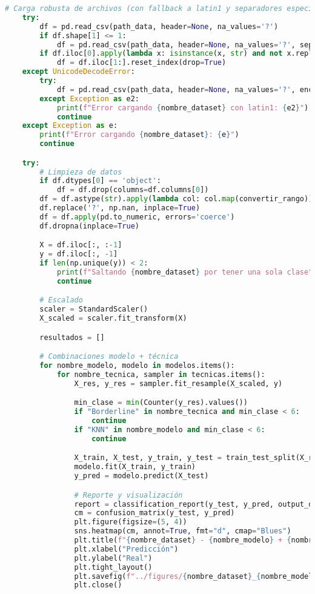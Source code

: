 \begin{lstlisting}[language=Python, caption={Script de experimentación automática}, label={lst:script_experimento}]
    # Carga robusta de archivos (con fallback a latin1 y separadores especiales)
    try:
        df = pd.read_csv(path_data, header=None, na_values='?')
        if df.shape[1] <= 1:
            df = pd.read_csv(path_data, header=None, na_values='?', sep='\s+')
        if df.iloc[0].apply(lambda x: isinstance(x, str) and not x.replace('.', '', 1).isdigit()).any():
            df = df.iloc[1:].reset_index(drop=True)
    except UnicodeDecodeError:
        try:
            df = pd.read_csv(path_data, header=None, na_values='?', encoding='latin1', sep='\s+', on_bad_lines='skip')
        except Exception as e2:
            print(f"Error cargando {nombre_dataset} con latin1: {e2}")
            continue
    except Exception as e:
        print(f"Error cargando {nombre_dataset}: {e}")
        continue

    try:
        # Limpieza de datos
        if df.dtypes[0] == 'object':
            df = df.drop(columns=df.columns[0])
        df = df.astype(str).apply(lambda col: col.map(convertir_rango))
        df.replace('?', np.nan, inplace=True)
        df = df.apply(pd.to_numeric, errors='coerce')
        df.dropna(inplace=True)

        X = df.iloc[:, :-1]
        y = df.iloc[:, -1]
        if len(np.unique(y)) < 2:
            print(f"Saltando {nombre_dataset} por tener una sola clase")
            continue

        # Escalado
        scaler = StandardScaler()
        X_scaled = scaler.fit_transform(X)

        resultados = []

        # Combinaciones modelo + técnica
        for nombre_modelo, modelo in modelos.items():
            for nombre_tecnica, sampler in tecnicas.items():
                X_res, y_res = sampler.fit_resample(X_scaled, y)

                min_clase = min(Counter(y_res).values())
                if "Borderline" in nombre_tecnica and min_clase < 6:
                    continue
                if "KNN" in nombre_modelo and min_clase < 6:
                    continue

                X_train, X_test, y_train, y_test = train_test_split(X_res, y_res, test_size=0.3, random_state=42)
                modelo.fit(X_train, y_train)
                y_pred = modelo.predict(X_test)

                # Reporte y visualización
                report = classification_report(y_test, y_pred, output_dict=True)
                cm = confusion_matrix(y_test, y_pred)
                plt.figure(figsize=(5, 4))
                sns.heatmap(cm, annot=True, fmt="d", cmap="Blues")
                plt.title(f"{nombre_dataset} - {nombre_modelo} + {nombre_tecnica}")
                plt.xlabel("Predicción")
                plt.ylabel("Real")
                plt.tight_layout()
                plt.savefig(f"../figures/{nombre_dataset}_{nombre_modelo}_{nombre_tecnica}_heatmap.png")
                plt.close()


\end{lstlisting}
